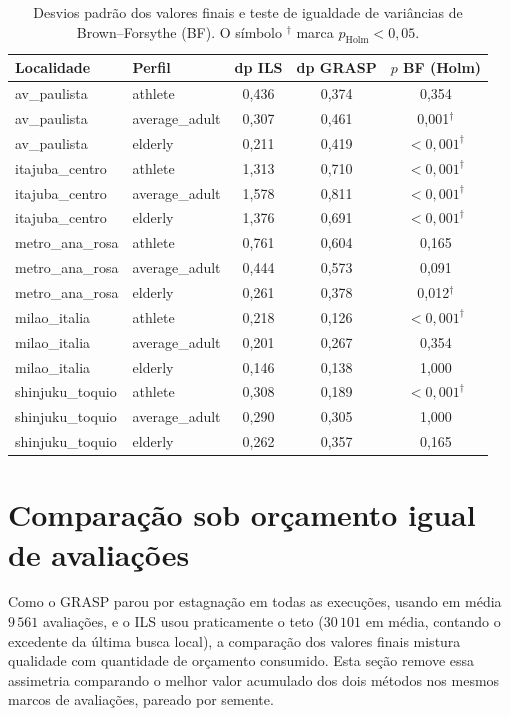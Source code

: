 \documentclass[11pt,a4paper]{article}
\begin{document}
\begin{table}[htbp]
\centering
\caption{Desvios padrão dos valores finais e teste de igualdade de variâncias de Brown--Forsythe (BF). O símbolo $^{\dagger}$ marca $p_{\text{Holm}} < 0{,}05$.}
\label{tab:comp-var}
\renewcommand{\arraystretch}{1.12}
\begin{tabular}{@{}l l c c c@{}}
\toprule
Localidade & Perfil & dp ILS & dp GRASP & $p$ BF (Holm) \\
\midrule
av\_paulista & athlete & 0,436 & 0,374 & 0,354 \\
av\_paulista & average\_adult & 0,307 & 0,461 & 0,001$^{\dagger}$ \\
av\_paulista & elderly & 0,211 & 0,419 & $<0{,}001^{\dagger}$ \\
itajuba\_centro & athlete & 1,313 & 0,710 & $<0{,}001^{\dagger}$ \\
itajuba\_centro & average\_adult & 1,578 & 0,811 & $<0{,}001^{\dagger}$ \\
itajuba\_centro & elderly & 1,376 & 0,691 & $<0{,}001^{\dagger}$ \\
metro\_ana\_rosa & athlete & 0,761 & 0,604 & 0,165 \\
metro\_ana\_rosa & average\_adult & 0,444 & 0,573 & 0,091 \\
metro\_ana\_rosa & elderly & 0,261 & 0,378 & 0,012$^{\dagger}$ \\
milao\_italia & athlete & 0,218 & 0,126 & $<0{,}001^{\dagger}$ \\
milao\_italia & average\_adult & 0,201 & 0,267 & 0,354 \\
milao\_italia & elderly & 0,146 & 0,138 & 1,000 \\
shinjuku\_toquio & athlete & 0,308 & 0,189 & $<0{,}001^{\dagger}$ \\
shinjuku\_toquio & average\_adult & 0,290 & 0,305 & 1,000 \\
shinjuku\_toquio & elderly & 0,262 & 0,357 & 0,165 \\
\bottomrule
\end{tabular}
\end{table}

\section{Comparação sob orçamento igual de avaliações}
\label{sec:comp-orcamento}

Como o GRASP parou por estagnação em todas as execuções, usando em média $9\,561$ avaliações, e o ILS usou praticamente o teto ($30\,101$ em média, contando o excedente da última busca local), a comparação dos valores finais mistura qualidade com quantidade de orçamento consumido. Esta seção remove essa assimetria comparando o melhor valor acumulado dos dois métodos nos mesmos marcos de avaliações, pareado por semente.
\end{document}
